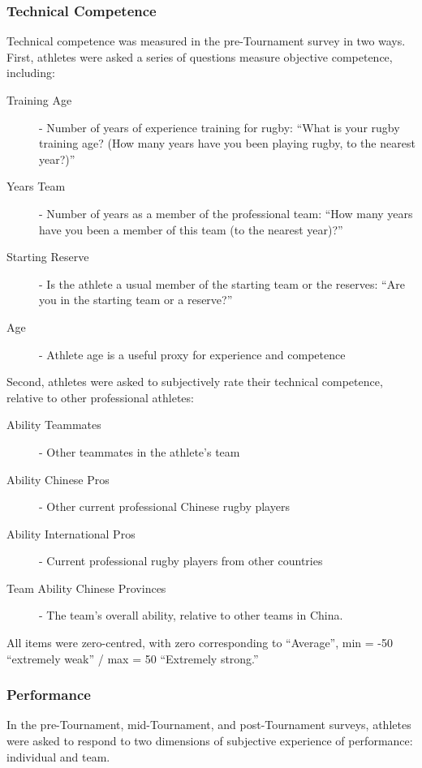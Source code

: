 \documentclass[12pt]{report}
\begin{document}
    \subsubsection{Technical Competence}

Technical competence was measured in the pre-Tournament survey in two ways. First, athletes were asked a series of questions measure objective competence, including: \\

\begin{description}
\item[Training Age] - Number of years of experience training for rugby:  ``What is your rugby training age? (How many years have you been playing rugby, to the nearest year?)''
\item[Years Team] - Number of years as a member of the professional team:  ``How many years have you been a member of this team (to the nearest year)?''
\item[Starting Reserve] - Is the athlete a usual member of the starting team or the reserves:  ``Are you in the starting team or a reserve?''
\item[Age] - Athlete age is a useful proxy for experience and competence
\end{description}
\bigskip


Second, athletes were asked to subjectively rate their technical competence, relative to other professional athletes:

\begin{description}
\item[Ability Teammates] - Other teammates in the athlete's team
\item[Ability Chinese Pros] - Other current professional Chinese rugby players
\item[Ability International Pros] - Current professional rugby players from other countries
\item[Team Ability Chinese Provinces] - The team's overall ability, relative to other teams in China.
\end{description}

All items were zero-centred, with zero corresponding to  ``Average'', min = -50  ``extremely weak'' / max = 50  ``Extremely strong.'' \\


    \subsubsection{Performance}
In the pre-Tournament, mid-Tournament, and post-Tournament surveys, athletes were asked to respond to two dimensions of subjective experience of performance: individual and team. \\
\end{document}
